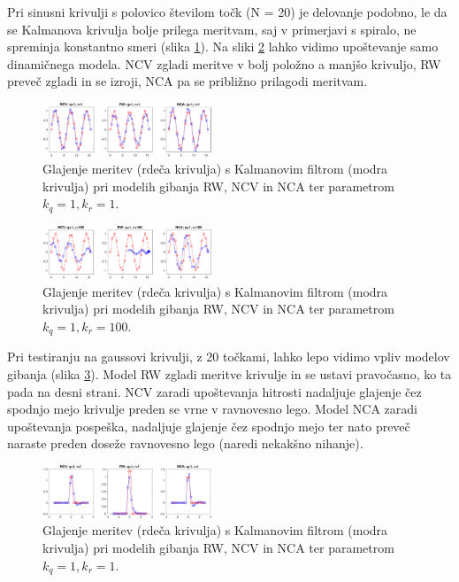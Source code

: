 \documentclass[a4paper]{article}
\begin{document}
Pri sinusni krivulji s polovico številom točk (N = 20) je delovanje podobno, le da se Kalmanova krivulja bolje prilega meritvam, saj v primerjavi s spiralo, ne spreminja konstantno smeri (slika \ref{sinq1r1}). Na sliki \ref{sinq1r100} lahko vidimo upoštevanje samo dinamičnega modela. NCV zgladi meritve v bolj položno a manjšo krivuljo, RW preveč zgladi in se izroji, NCA pa se približno prilagodi meritvam. 
\begin{figure}[h]
	\begin{center}
		\includegraphics [width=0.45\textwidth] {sinq1r1.pdf}
	\end{center}
	\caption{Glajenje meritev (rdeča krivulja) s Kalmanovim filtrom (modra krivulja) pri modelih gibanja RW, NCV in NCA ter parametrom $k_q=1, k_r=1$. }
	\label{sinq1r1}
\end{figure} 
\begin{figure}[h]
	\begin{center}
		\includegraphics [width=0.45\textwidth] {sinq1r100.pdf}
	\end{center}
	\caption{Glajenje meritev (rdeča krivulja) s Kalmanovim filtrom (modra krivulja) pri modelih gibanja RW, NCV in NCA ter parametrom $k_q=1, k_r=100$. }
	\label{sinq1r100}
\end{figure} 

Pri testiranju na gaussovi krivulji, z 20 točkami, lahko lepo vidimo vpliv modelov gibanja (slika \ref{gaq1r1}). Model RW zgladi meritve krivulje in se ustavi pravočasno, ko ta pada na desni strani. NCV zaradi upoštevanja hitrosti nadaljuje glajenje čez spodnjo mejo krivulje preden se vrne v ravnovesno lego. Model NCA zaradi upoštevanja pospeška, nadaljuje glajenje čez spodnjo mejo ter nato preveč naraste preden doseže ravnovesno lego (naredi nekakšno nihanje).
\begin{figure}[h]
	\begin{center}
		\includegraphics [width=0.45\textwidth] {gaq1r1.pdf}
	\end{center}
	\caption{Glajenje meritev (rdeča krivulja) s Kalmanovim filtrom (modra krivulja) pri modelih gibanja RW, NCV in NCA ter parametrom $k_q=1, k_r=1$. }
	\label{gaq1r1}
\end{figure} 
\end{document}
